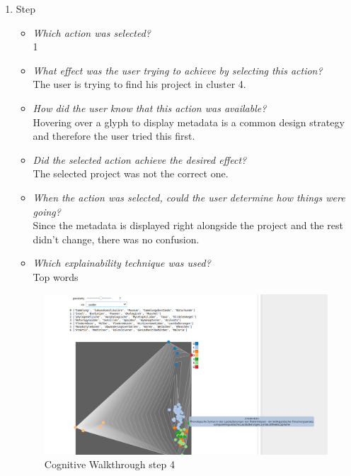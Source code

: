{\begin{enumerate}
		\item Step
		\begin{itemize}
			\item \textit{Which action was selected?} \\
			1
			\item \textit{What effect was the user trying to achieve by selecting this action?} \\
			The user is trying to find his project in cluster 4. 
			\item \textit{How did the user know that this action was available?} \\
			Hovering over a glyph to display metadata is a common design strategy and therefore the user tried this first. 
			\item \textit{Did the selected action achieve the desired effect?} \\
			The selected project was not the correct one. 
			\item \textit{When the action was selected, could the user determine how things were going?} \\
			Since the metadata is displayed right alongside the project and the rest didn't change, there was no confusion.
			\item \textit{Which explainability technique was used?}\\
			Top words
		\end{itemize}
		\begin{figure}[H]
			\centering
			\includegraphics[width=400px]{../chapters/validation/pics/3_c}
			\caption{\label{pic:step4} Cognitive Walkthrough step 4}
		\end{figure} \newpage
		

\end{enumerate}}
